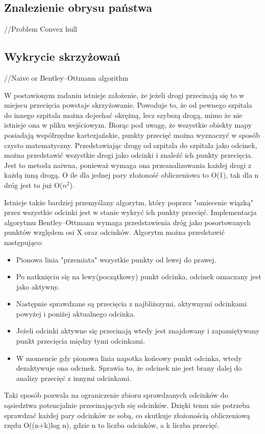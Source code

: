 \documentclass[10pt,a4paper]{article}
\begin{document}
\subsection{Znalezienie obrysu państwa}

//Problem Convex hull

\subsection{Wykrycie skrzyżowań}

//Naive or Bentley–Ottmann algorithm


W postawionym zadaniu istnieje założenie, że jeżeli drogi przecinają się to w miejscu przecięcia powstaje skrzyżowanie.
Powoduje to, że od pewnego szpitala do innego szpitala można dojechać okrężną, lecz szybszą drogą, mimo że nie istnieje ona w pliku wejściowym.
Biorąc pod uwagę, że wszystkie obiekty mapy posiadają współrzędne kartezjańskie, punkty przecięć można wyznaczyć w sposób czysto matematyczny.
Przedstawiając drogę od szpitala do szpitala jako odcinek, można przedstawić wszystkie drogi jako odcinki i znaleźć ich punkty przecięcia.
Jest to metoda naiwna, ponieważ wymaga ona przeanalizowania każdej drogi z każdą inną drogą.
O ile dla jednej pary złożoność obliczeniowa to O(1), tak dla n dróg jest to już O($n^2$).

Istnieje także bardziej przemyślany algorytm, który poprzez "omiecenie wiązką" przez wszystkie odcinki jest w stanie wykryć ich punkty przecięć.
Implementacja algorytmu Bentley–Ottmann wymaga przedstawienia dróg jako posortowanych punktów względem osi X oraz odcinków. Algorytm można przedstawić następująco:
\begin{itemize}
    \item Pionowa linia "przemiata" wszystkie punkty od lewej do prawej.
    \item Po natknięciu się na lewy(początkowy) punkt odcinka, odcinek oznaczany jest jako aktywny.
    \item Następnie sprawdzane są przecięcia z najbliższymi, aktywnymi odcinkami powyżej i poniżej aktualnego odcinka.
    \item Jeżeli odcinki aktywne się przecinają wtedy jest znajdowany i zapamiętywany punkt przecięcia między tymi odcinkami.
    \item W momencie gdy pionowa linia napotka końcowy punkt odcinka, wtedy dezaktywuje ona odcinek. Sprawia to, że odcinek nie jest brany dalej do analizy przecięć z innymi odcinkami.
\end{itemize}
Taki sposób pozwala na ograniczenie zbioru sprawdzanych odcinków do sąsiedztwa potencjalnie przecinających się odcinków.
Dzięki temu nie potrzeba sprawdzać każdej pary odcinków ze sobą, co skutkuje złożonością obliczeniową rzędu O((n+k)log n), gdzie n to liczba odcinków, a k liczba przecięć.
\end{document}
